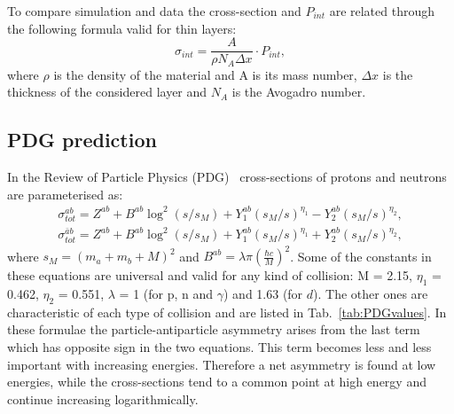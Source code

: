 To compare simulation and data the cross-section and $P_{int}$ are related through the following formula valid for thin layers:
%
\begin{equation}
\label{sigmaPint}
\sigma_{int} = \frac{A}{\rho N_A \Delta x} \cdot P_{int},
\end{equation}
%
where $\rho$ is the density of the material and A is its mass number, $\Delta x$ is the thickness of the considered layer and $N_A$ is the Avogadro number.

\subsection{PDG prediction}

In the Review of Particle Physics (PDG)~\cite{PDG2014} cross-sections of protons and neutrons are parameterised as:
%
\begin{align} 
\sigma_{tot}^{ab} = Z^{ab} + B^{ab}\log^2(s/s_M) + Y^{ab}_1(s_M/s)^{\eta_1} - Y^{ab}_2(s_M/s)^{\eta_2}, \\
\sigma^{\bar{a}b}_{tot} = Z^{ab} + B^{ab}\log^2(s/s_M) + Y^{ab}_1(s_M/s)^{\eta_1} + Y^{ab}_2(s_M/s)^{\eta_2},
\end{align}
%
where $s_M = (m_a + m_b + M)^2$ and $B^{ab} = \lambda \pi ( \frac{\hbar c }{M}  )^2$. Some of the constants in these 
equations are universal and valid for any kind of collision: M = 2.15, $\eta_1$ = 0.462, $\eta_2$ = 0.551, $\lambda$ = 1 
(for p, n and $\gamma$) and 1.63 (for $d$). The other ones are characteristic of each type of collision and are listed 
in Tab.~\ref{tab:PDGvalues}. In these formulae the particle-antiparticle asymmetry arises from the last term which has opposite
sign in the two equations. This term becomes less and less important with increasing energies. Therefore a net asymmetry 
is found at low energies, while the cross-sections tend to a common point at high energy and continue increasing logarithmically.
%
\begin{center}
\begin{table}[b]
\centering
{}
\caption{Values for the constants $Z^{ab}$, $Y^{ab}_1$ and $Y^{ab}_2$~\cite{PDG2014}, 
which parameterise hadronic cross-sections. }
\label{tab:PDGvalues}
\end{table}
\end{center}


